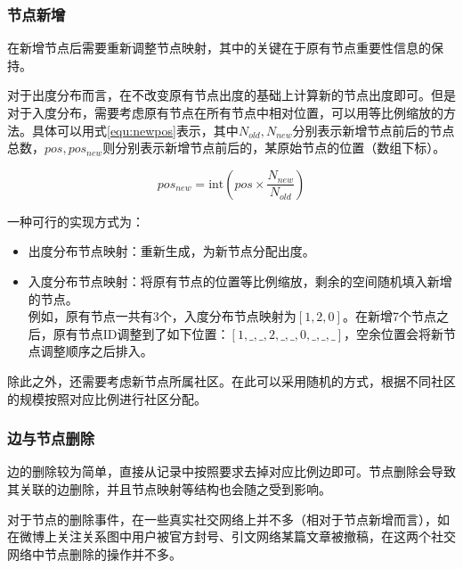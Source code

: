\vspace{0.2cm}

\subsubsection{节点新增}

在新增节点后需要重新调整节点映射，其中的关键在于原有节点重要性信息的保持。

对于出度分布而言，在不改变原有节点出度的基础上计算新的节点出度即可。但是对于入度分布，需要考虑原有节点在所有节点中相对位置，可以用等比例缩放的方法。具体可以用式\ref{equ:newpos}表示，其中$N_{old}, N_{new}$分别表示新增节点前后的节点总数，$pos, pos_{new}$则分别表示新增节点前后的，某原始节点的位置（数组下标）。

\vspace{-8mm}

\begin{equation}
  \label{equ:newpos}
  pos_{new} = \text{int}\left(pos\times \frac{N_{new}}{N_{old}}\right)
\end{equation}

一种可行的实现方式为：

\begin{itemize}
  \item 出度分布节点映射：重新生成，为新节点分配出度。
  \item 入度分布节点映射：将原有节点的位置等比例缩放，剩余的空间随机填入新增的节点。\\
  例如，原有节点一共有3个，入度分布节点映射为$[1,2,0]$。在新增7个节点之后，原有节点ID调整到了如下位置：$[1,\_,\_,2,\_,\_,0,\_,\_,\_]$，空余位置会将新节点调整顺序之后排入。
\end{itemize}

\vspace{0.2cm}

除此之外，还需要考虑新节点所属社区。在此可以采用随机的方式，根据不同社区的规模按照对应比例进行社区分配。

\subsubsection{边与节点删除}

边的删除较为简单，直接从记录中按照要求去掉对应比例边即可。节点删除会导致其关联的边删除，并且节点映射等结构也会随之受到影响。

对于节点的删除事件，在一些真实社交网络上并不多（相对于节点新增而言），如在微博上关注关系图中用户被官方封号、引文网络某篇文章被撤稿，在这两个社交网络中节点删除的操作并不多。


